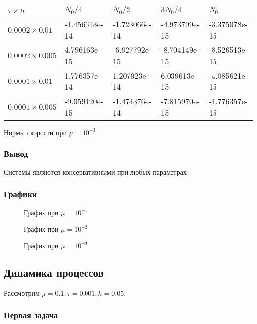 \documentclass[12pt]{article}
\begin{document}
\begin{center}
  \begin{tabular}{| l | l | l | l | l | }
    \hline
	$\tau \times h$ & $N_{0} / 4$ & $N_{0} / 2$ & $3N_{0} / 4$ & $N_{0}$  \\ \hline
$0.0002 \times 0.01$ & -1.456613e-14 & -1.723066e-14 & -4.973799e-15 & -3.375078e-15  \\ \hline
$0.0002 \times 0.005$ & 4.796163e-15 & -6.927792e-15 & -8.704149e-15 & -8.526513e-15  \\ \hline
$0.0001 \times 0.01$ & 1.776357e-14 & 1.207923e-14 & 6.039613e-15 & -4.085621e-15  \\ \hline
$0.0001 \times 0.005$ & -9.059420e-15 & -1.474376e-14 & -7.815970e-15 & -1.776357e-15  \\ \hline
  \end{tabular}
  $ \text {Нормы скорости при } \mu=10^{-3}$
\end{center}
\vfill
\subsubsection{Вывод}
Системы являются консервативными при любых параметрах
\subsubsection{Графики}
\begin{figure}[H]
\caption{График при $\mu=10^{-1}$}
\label{fig:image}
\end{figure}

\begin{figure}[H]
\caption{График при $\mu=10^{-2}$}
\label{fig:image}
\end{figure}

\begin{figure}[H]
\caption{График при $\mu=10^{-3}$}
\label{fig:image}
\end{figure}

\subsection{Динамика процессов}
Рассмотрим $\mu = 0.1, \tau = 0.001, h = 0.05.$
\subsubsection{Первая задача}
\end{document}
